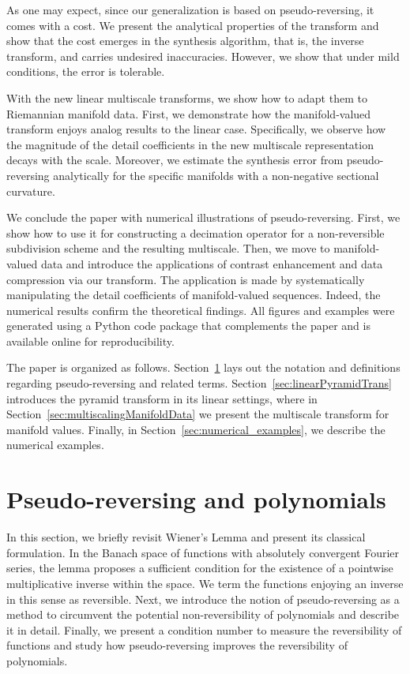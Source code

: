 \documentclass[12pt]{article}
\begin{document}
As one may expect, since our generalization is based on pseudo-reversing, it comes with a cost. We present the analytical properties of the transform and show that the cost emerges in the synthesis algorithm, that is, the inverse transform, and carries undesired inaccuracies. However, we show that under mild conditions, the error is tolerable.

With the new linear multiscale transforms, we show how to adapt them to Riemannian manifold data. First, we demonstrate how the manifold-valued transform enjoys analog results to the linear case. Specifically, we observe how the magnitude of the detail coefficients in the new multiscale representation decays with the scale. Moreover, we estimate the synthesis error from pseudo-reversing analytically for the specific manifolds with a non-negative sectional curvature.

We conclude the paper with numerical illustrations of pseudo-reversing. First, we show how to use it for constructing a decimation operator for a non-reversible subdivision scheme and the resulting multiscale. Then, we move to manifold-valued data and introduce the applications of contrast enhancement and data compression via our transform. The application is made by systematically manipulating the detail coefficients of manifold-valued sequences. Indeed, the numerical results confirm the theoretical findings. All figures and examples were generated using a Python code package that complements the paper and is available online for reproducibility.

The paper is organized as follows. Section~\ref{sec:pseudo-reversing} lays out the notation and definitions regarding pseudo-reversing and related terms. Section~\ref{sec:linearPyramidTrans} introduces the pyramid transform in its linear settings, where in Section~\ref{sec:multiscalingManifoldData} we present the multiscale transform for manifold values. Finally, in Section~\ref{sec:numerical_examples}, we describe the numerical examples.

\section{Pseudo-reversing and polynomials}\label{sec:pseudo-reversing}

In this section, we briefly revisit Wiener's Lemma and present its classical formulation. In the Banach space of functions with absolutely convergent Fourier series, the lemma proposes a sufficient condition for the existence of a pointwise multiplicative inverse within the space. We term the functions enjoying an inverse in this sense as reversible. Next, we introduce the notion of pseudo-reversing as a method to circumvent the potential non-reversibility of polynomials and describe it in detail. Finally, we present a condition number to measure the reversibility of functions and study how pseudo-reversing improves the reversibility of polynomials.
\end{document}
